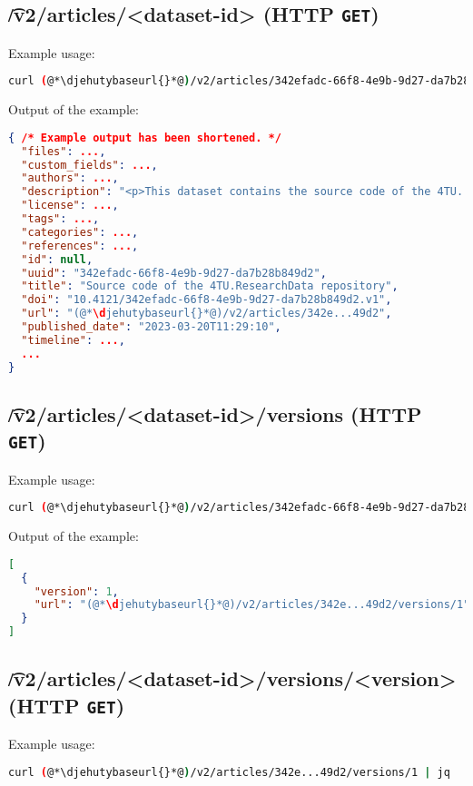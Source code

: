\subsection{\t{/v2/articles/<dataset-id>} (HTTP \texttt{GET})}
\label{sec:v2-articles-dataset-id}
  Example usage:
\begin{lstlisting}[language=bash]
curl (@*\djehutybaseurl{}*@)/v2/articles/342efadc-66f8-4e9b-9d27-da7b28b849d2 | jq
\end{lstlisting}

  Output of the example:
\begin{lstlisting}[language=JSON]
{ /* Example output has been shortened. */
  "files": ...,
  "custom_fields": ...,
  "authors": ...,
  "description": "<p>This dataset contains the source code of the 4TU...",
  "license": ...,
  "tags": ...,
  "categories": ...,
  "references": ...,
  "id": null,
  "uuid": "342efadc-66f8-4e9b-9d27-da7b28b849d2",
  "title": "Source code of the 4TU.ResearchData repository",
  "doi": "10.4121/342efadc-66f8-4e9b-9d27-da7b28b849d2.v1",
  "url": "(@*\djehutybaseurl{}*@)/v2/articles/342e...49d2",
  "published_date": "2023-03-20T11:29:10",
  "timeline": ...,
  ...
}
\end{lstlisting}

\subsection{\t{/v2/articles/<dataset-id>/versions} (HTTP \texttt{GET})}

  Example usage:
\begin{lstlisting}[language=bash]
curl (@*\djehutybaseurl{}*@)/v2/articles/342efadc-66f8-4e9b-9d27-da7b28b849d2/versions | jq
\end{lstlisting}

  Output of the example:
\begin{lstlisting}[language=JSON]
[
  {
    "version": 1,
    "url": "(@*\djehutybaseurl{}*@)/v2/articles/342e...49d2/versions/1"
  }
]
\end{lstlisting}

\subsection{\t{/v2/articles/<dataset-id>/versions/<version>} (HTTP \texttt{GET})}

  Example usage:
\begin{lstlisting}[language=bash]
curl (@*\djehutybaseurl{}*@)/v2/articles/342e...49d2/versions/1 | jq
\end{lstlisting}

